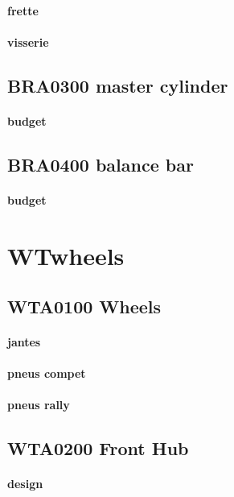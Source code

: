 		\paragraph{frette} 
		\paragraph{visserie} 
	\subsection*{BR\textunderscore A0300 master cylinder} 
 \par 
		\paragraph{budget} 
	\subsection*{BR\textunderscore A0400 balance bar} 
 \par 
		\paragraph{budget} 
\newpage 
 \section*{WT\textunderscore wheels} 
 \par 
	\subsection*{WT\textunderscore A0100 Wheels} 
 \par 
		\paragraph{jantes} 
		\paragraph{pneus compet} 
		\paragraph{pneus rally} 
	\subsection*{WT\textunderscore A0200 Front Hub} 
 \par 
		\paragraph{design} 
